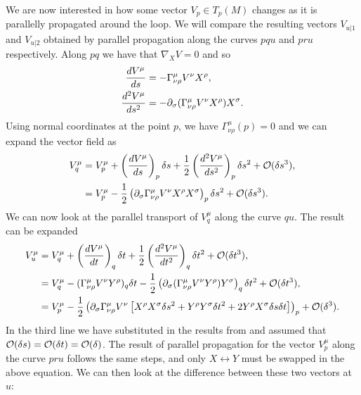 We are now interested in how some vector $V_p \in T_p(M)$ changes as it is parallelly propagated around the loop. We will compare the resulting vectors $V_{u|1}$ and $V_{u|2}$ obtained by parallel propagation along the curves $pqu$ and $pru$ respectively. Along $pq$ we have that $\nabla_X V = 0$ and so
\begin{equation*}
\begin{aligned}
  \frac{d V^\mu}{d s} &= - \Gamma_{\nu \rho}^\mu V^\nu X^\rho, \\
  \frac{d ^2 V^\mu}{d s^2} &= - \partial_\sigma (\Gamma_{\nu \rho}^\mu V^\nu X^\rho) X^\sigma.
\end{aligned}
\end{equation*}
Using normal coordinates at the point $p$, we have $\Gamma^\mu_{\nu \rho} (p) = 0$ and we can expand the vector field as
\begin{equation}
\label{eq:ppproof1}
	\begin{aligned}
		V^\mu_q &= V^\mu_p + \left(\frac{d V^\mu}{d s} \right)_p \delta s + \frac{1}{2} \left(\frac{d ^2V^\mu}{d s^2} \right)_p \delta s^2 + {\cal O}(\delta s^3) ,\\
		&= V^\mu_p  - \frac{1}{2} \left( \partial_\sigma \Gamma_{\nu \rho}^\mu V^\nu X^\rho X^\sigma \right)_p \delta s^2 + {\cal O}(\delta s^3) .
	\end{aligned} 
\end{equation}
We can now look at the parallel transport of $V^\mu_q$ along the curve $qu$. The result can be expanded
\begin{equation*}
\begin{aligned}
	V^\mu_u &= V^\mu_q + \left(\frac{d V^\mu}{d t} \right)_q \delta t + \frac{1}{2} \left(\frac{d ^2V^\mu}{d t^2} \right)_q \delta t^2 + {\cal O}(\delta t^3), \\
	&= V^\mu_q - (\Gamma^\mu_{\nu \rho} V^\nu Y^\rho)_q \delta t - \frac{1}{2} \left( \partial_\sigma (\Gamma_{\nu \rho}^\mu V^\nu Y^\rho) Y^\sigma \right)_q \delta t^2 + {\cal O}(\delta t^3), \\
	&= V^\mu_p - \frac{1}{2} \left( \partial_\sigma \Gamma^\mu_{\nu \rho} V^\nu \left[ X^\rho X^\sigma \delta s^2 + Y^\rho Y^\sigma \delta t^2 + 2 Y^\rho X^\sigma \delta s \delta t \right] \right)_p + {\cal O}(\delta^3).
\end{aligned}
\end{equation*}
In the third line we have substituted in the results from  and assumed that ${\cal O}(\delta s) = {\cal O}(\delta t) = {\cal O}(\delta)$. The result of parallel propagation for the vector $V^\mu_p$ along the curve $pru$ follows the same steps, and only $X \leftrightarrow Y$ must be swapped in the above equation. We can then look at the difference between these two vectors at $u$:
